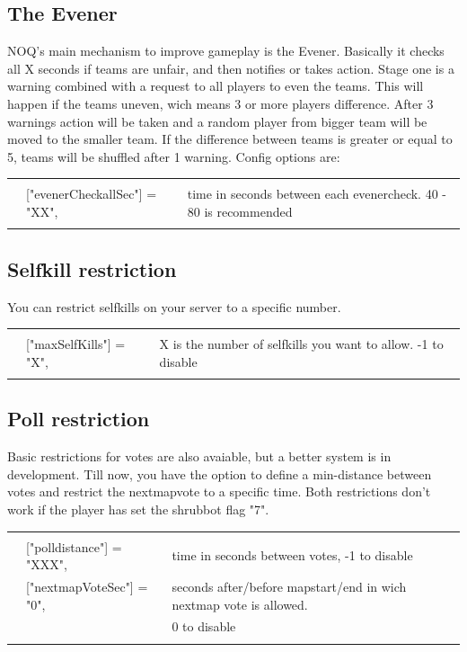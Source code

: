 \documentclass[12pt,a4paper]{article}
\numberwithin{footnote}{page} %
\begin{document}
	

\subsection{The Evener}

NOQ's main mechanism to improve gameplay is the Evener. 
Basically it checks all X seconds if teams are unfair, and then notifies or takes action.
Stage one is a warning combined with a request to all players to even the teams.
This will happen if the teams uneven, wich means 3 or more players difference.
After 3 warnings action will be taken and a random player from bigger team will be moved to the smaller team.
If the difference between teams is greater or equal to 5, teams will be shuffled after 1 warning.
Config options are:
\\
\begin{tabular}{l l|l}
\hline & & \\
 & 	["evenerCheckallSec"] = "XX", & time in seconds between each evenercheck. 40 - 80 is recommended  \\
  & &  \\
 \hline
\end{tabular}

\subsection{Selfkill restriction}
You can restrict selfkills on your server to a specific number.
\\
\begin{tabular}{l l|l}
\hline & & \\
 & 	["maxSelfKills"] = "X", & X is the number of selfkills you want to allow. -1 to disable  \\
  & &  \\
 \hline
\end{tabular}


\subsection{Poll restriction}
Basic restrictions for votes are also avaiable, but a better system is in development.
Till now, you have the option to define a min-distance between votes and restrict the nextmapvote to a specific time. Both restrictions don't work if the player has set the shrubbot flag "7".
\\
\begin{tabular}{l l|l}
\hline & & \\
 & 	["polldistance"] = "XXX",  & time in seconds between votes, -1 to disable \\
 &	["nextmapVoteSec"] = "0", &  seconds after/before mapstart/end in wich nextmap vote is allowed.\\
 & & 0 to disable \\
  & &  \\
 \hline
\end{tabular}
\end{document}
